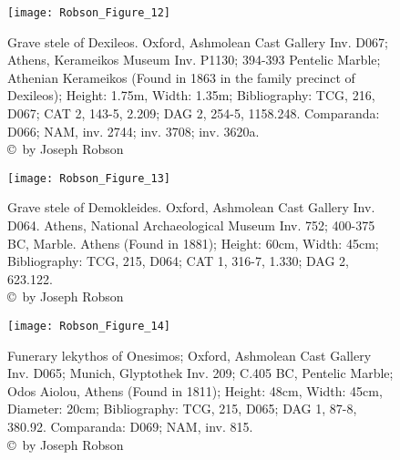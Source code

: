 \begin{figure}[!htb]
	\texttt{[image: Robson\_Figure\_12]}

	\caption{Grave stele of Dexileos. Oxford, Ashmolean Cast Gallery Inv. D067; Athens, Kerameikos Museum Inv. P1130; 394-393 \BC Pentelic Marble; Athenian Kerameikos (Found in 1863 in the family precinct of Dexileos); Height: 1.75m, Width: 1.35m; Bibliography: TCG, 216, D067; CAT 2, 143-5, 2.209; DAG 2, 254-5, 1158.248.
		Comparanda: D066; NAM, inv. 2744; inv. 3708; inv. 3620a.
		{\normalfont\scriptsize \\ \copyright\ by Joseph Robson}}
	\label{fig:Robson_Figure_12}
\end{figure}


\begin{figure}[!htb]
	\texttt{[image: Robson\_Figure\_13]}

	\caption{Grave stele of Demokleides. Oxford, Ashmolean Cast Gallery Inv. D064. Athens, National Archaeological Museum Inv. 752; 400-375 BC, Marble. Athens (Found in 1881); Height: 60cm, Width: 45cm; Bibliography: TCG, 215, D064; CAT 1, 316-7, 1.330; DAG 2, 623.122.
		{\normalfont\scriptsize \\ \copyright\ by Joseph Robson}}
	\label{fig:Robson_Figure_13}
\end{figure}

\begin{figure}[!htb]
	\texttt{[image: Robson\_Figure\_14]}

	\caption{Funerary lekythos of Onesimos; Oxford, Ashmolean Cast Gallery Inv. D065; Munich, Glyptothek Inv. 209; C.405 BC, Pentelic Marble; Odos Aiolou, Athens (Found in 1811); Height: 48cm, Width: 45cm, Diameter: 20cm; Bibliography: TCG, 215, D065; DAG 1, 87-8, 380.92.
		Comparanda: D069; NAM, inv. 815.
		{\normalfont\scriptsize \\ \copyright\ by Joseph Robson}}
	\label{fig:Robson_Figure_14}
\end{figure}

\IJSRAclosing%
